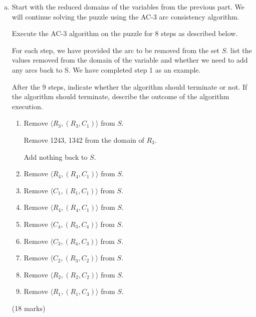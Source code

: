 \documentclass[12pt]{article}
\begin{document}
\begin{enumerate}[(a)]
\begin{markscheme}
(8 marks)

\begin{itemize}
    \item (4 marks) The domains for $R_1 \dots R_4$.
    \item (4 marks) The domains for $C_1 \dots C_4$.
\end{itemize}

\end{markscheme}


\item
Start with the reduced domains of the variables from the previous part. We will continue solving the puzzle using the AC-3 arc consistency algorithm.

Execute the AC-3 algorithm on the puzzle for 8 steps as described below. 

For each step, we have provided the arc to be removed from the set $S$. list the values removed from the domain of the variable and whether we need to add any arcs back to S. We have completed step 1 as an example.

After the 9 steps, indicate whether the algorithm should terminate or not. If the algorithm should terminate, describe the outcome of the algorithm execution.

\begin{enumerate}[(1)]
\item Remove $\langle R_3, (R_3, C_1) \rangle$ from $S$.

Remove 1243, 1342 from the domain of $R_3$.

Add nothing back to $S$.

\item Remove $\langle R_4, (R_4, C_1) \rangle$ from $S$.
\item Remove $\langle C_1, (R_1, C_1) \rangle$ from $S$.
\item Remove $\langle R_4, (R_4, C_1) \rangle$ from $S$.
\item Remove $\langle C_4, (R_3, C_4) \rangle$ from $S$.
\item Remove $\langle C_3, (R_4, C_3) \rangle$ from $S$.
\item Remove $\langle C_2, (R_3, C_2) \rangle$ from $S$.
\item Remove $\langle R_2, (R_2, C_2) \rangle$ from $S$.
\item Remove $\langle R_1, (R_1, C_3) \rangle$ from $S$.
\end{enumerate}

\begin{markscheme}
(18 marks)


\end{markscheme}
\end{enumerate}
\end{document}
